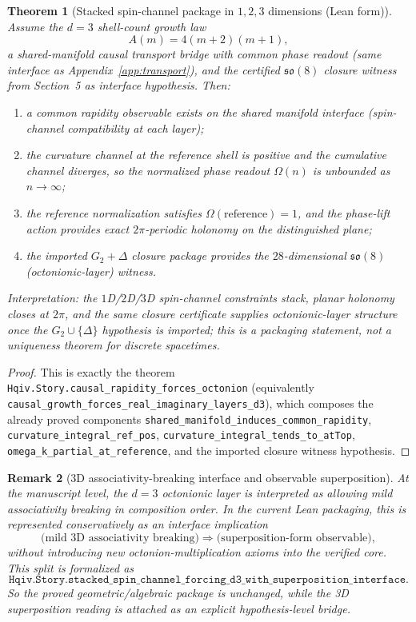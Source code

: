 \documentclass[11pt]{amsart}
\newtheorem{theorem}{Theorem}[section]
\newtheorem{remark}[theorem]{Remark}
\begin{document}
\begin{theorem}[Stacked spin-channel package in \texorpdfstring{$1,2,3$}{1,2,3} dimensions (Lean form)]
Assume the \(d=3\) shell-count growth law
\[
A(m)=4(m+2)(m+1),
\]
a shared-manifold causal transport bridge with common phase readout (same interface as Appendix~\ref{app:transport}), and the certified \(\mathfrak{so}(8)\) closure witness from Section~5 as interface hypothesis. Then:
\begin{enumerate}
  \item a common rapidity observable exists on the shared manifold interface (spin-channel compatibility at each layer);
  \item the curvature channel at the reference shell is positive and the cumulative channel diverges, so the normalized phase readout \(\Omega(n)\) is unbounded as \(n\to\infty\);
  \item the reference normalization satisfies \(\Omega(\mathrm{reference})=1\), and the phase-lift action provides exact \(2\pi\)-periodic holonomy on the distinguished plane;
  \item the imported \(G_2+\Delta\) closure package provides the \(28\)-dimensional \(\mathfrak{so}(8)\) (octonionic-layer) witness.
\end{enumerate}
Interpretation: the \(1\)D/\(2\)D/\(3\)D spin-channel constraints stack, planar holonomy closes at \(2\pi\), and the same closure certificate supplies octonionic-layer structure once the \(G_2\cup\{\Delta\}\) hypothesis is imported; this is a packaging statement, not a uniqueness theorem for discrete spacetimes.
\end{theorem}

\begin{proof}
This is exactly the theorem \texttt{Hqiv.Story.causal\_rapidity\_forces\_octonion} (equivalently \texttt{causal\_growth\_forces\_real\_imaginary\_layers\_d3}), which composes the already proved components
\texttt{shared\_manifold\_induces\_common\_rapidity},
\texttt{curvature\_integral\_ref\_pos},
\texttt{curvature\_integral\_tends\_to\_atTop},
\texttt{omega\_k\_partial\_at\_reference},
and the imported closure witness hypothesis.
\end{proof}

\begin{remark}[3D associativity-breaking interface and observable superposition]
At the manuscript level, the \(d=3\) octonionic layer is interpreted as allowing mild associativity breaking in composition order. In the current Lean packaging, this is represented conservatively as an interface implication
\[
\text{(mild 3D associativity breaking)}\Longrightarrow \text{(superposition-form observable)},
\]
without introducing new octonion-multiplication axioms into the verified core. This split is formalized as
\[
\texttt{Hqiv.Story.stacked\_spin\_channel\_forcing\_d3\_with\_superposition\_interface}.
\]
So the proved geometric/algebraic package is unchanged, while the 3D superposition reading is attached as an explicit hypothesis-level bridge.
\end{remark}
\end{document}
